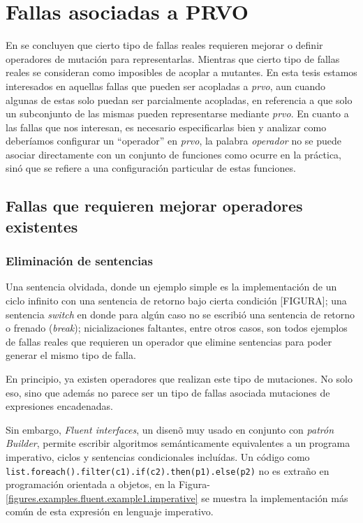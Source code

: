 \section{Fallas asociadas a PRVO}
\label{sec:prvo.prvoTargetedFaults}

En \cite{bibliography.mutation.evaluation.valid-substitute} se concluyen que cierto tipo de fallas reales requieren mejorar o definir operadores de mutaci\'on para representarlas. Mientras que cierto tipo de fallas reales se consideran como imposibles de acoplar a mutantes. En esta tesis estamos interesados en aquellas fallas que pueden ser acopladas a \emph{prvo}, aun cuando algunas de estas solo puedan ser parcialmente acopladas, en referencia a que solo un subconjunto de las mismas pueden representarse mediante \emph{prvo}. En cuanto a las fallas que nos interesan, es necesario especificarlas bien y analizar como deber\'iamos configurar un ``operador'' en \emph{prvo}, la palabra \emph{operador} no se puede asociar directamente con un conjunto de funciones como ocurre en la pr\'actica, sin\'o que se refiere a una configuraci\'on particular de estas funciones. %

\subsection{Fallas que requieren mejorar operadores existentes}

\subsubsection{Eliminaci\'on de sentencias}

Una sentencia olvidada, donde un ejemplo simple es la implementaci\'on de un ciclo infinito con una sentencia de retorno bajo cierta condici\'on [FIGURA]; una sentencia \emph{switch} en donde para alg\'un caso no se escribi\'o una sentencia de retorno o frenado (\emph{break}); nicializaciones faltantes, entre otros casos, son todos ejemplos de fallas reales que requieren un operador que elimine sentencias para poder generar el mismo tipo de falla.

En principio, ya existen operadores que realizan este tipo de mutaciones. No solo eso, sino que adem\'as no parece ser un tipo de fallas asociada mutaciones de expresiones encadenadas.

Sin embargo, \emph{Fluent interfaces}, un disen\~o muy usado en conjunto con \emph{patr\'on Builder}, permite escribir algoritmos sem\'anticamente equivalentes a un programa imperativo, ciclos y sentencias condicionales inclu\'idas. Un c\'odigo como \lstinline|list.foreach().filter(c1).if(c2).then(p1).else(p2)| no es extra\~no en programaci\'on orientada a objetos, en la Figura-\ref{figures.examples.fluent.example1.imperative} se muestra la implementaci\'on m\'as com\'un de esta expresi\'on en lenguaje imperativo.

